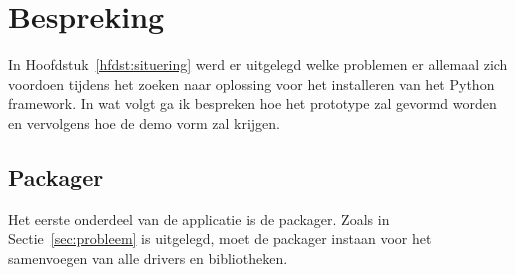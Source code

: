 \chapter{Bespreking}
In Hoofdstuk~\vref{hfdst:situering} werd er uitgelegd welke problemen er allemaal zich voordoen tijdens het zoeken naar oplossing voor het installeren van het Python framework. 
In wat volgt ga ik bespreken hoe het prototype zal gevormd worden en vervolgens hoe de demo vorm zal krijgen.

\section{Packager}
Het eerste onderdeel van de applicatie is de packager.
Zoals in Sectie~\ref{sec:probleem} is uitgelegd, moet de packager instaan voor het samenvoegen van alle drivers en bibliotheken.



